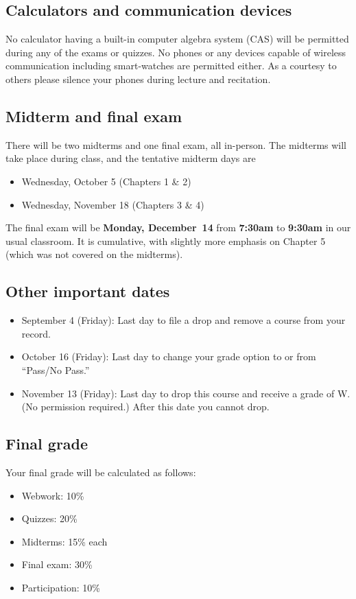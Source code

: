 \documentclass[12pt]{amsart}
\begin{document}
\subsection*{Calculators and communication devices} No calculator having a built-in computer algebra system (CAS) will be permitted during any of the exams or quizzes. No phones or any devices capable of wireless communication including smart-watches are permitted either. As a courtesy to others please silence your phones during lecture and recitation.

\subsection*{Midterm and final exam} There will be two {midterms} and one {final exam}, all in-person. The midterms will take place during class, and the tentative midterm days are 
\begin{itemize}
\item Wednesday, October 5 (Chapters 1 \& 2)
\item Wednesday, November 18 (Chapters 3 \& 4)
\end{itemize}
The final exam will be 
{\bf Monday, December~14} from \textbf{7:30am} to \textbf{9:30am} in our usual classroom. It is cumulative, with slightly more emphasis on Chapter 5 (which was not covered on the midterms).

\subsection*{Other important dates} \begin{itemize}
\item September 4 (Friday):  Last day to file a drop and remove a course from your record.
\item October 16 (Friday):  Last day to change your grade option to or from ``Pass/No Pass.''
\item November 13 (Friday):  Last day to drop this course and receive a grade of W. \\(No permission required.) After this date you cannot drop.
\end{itemize} 

\subsection*{Final grade} Your final grade will be calculated as follows:

\begin{itemize}

	\item Webwork: 10\%
	\item Quizzes: 20\%
	\item Midterms: 15\% each
	\item Final exam: 30\%
		\item Participation: 10\%
\end{itemize}
\end{document}
